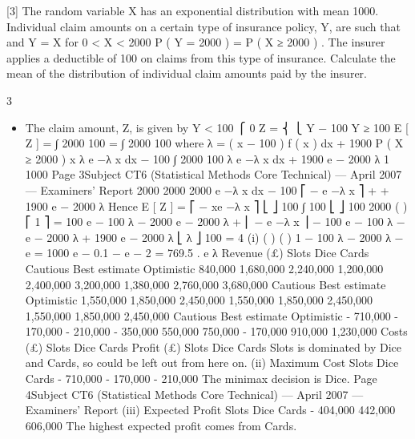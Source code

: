 \documentclass[a4paper,12pt]{article}
\begin{document}

[3]
The random variable X has an exponential distribution with mean 1000. Individual
claim amounts on a certain type of insurance policy, Y, are such that
and
Y = X
for 0 < X < 2000
P ( Y = 2000 ) = P ( X ≥ 2000 ) .
The insurer applies a deductible of 100 on claims from this type of insurance.
Calculate the mean of the distribution of individual claim amounts paid by the insurer.


3
\begin{itemize}
\item The claim amount, Z, is given by
Y < 100
⎧ 0
Z = ⎨
⎩ Y − 100 Y ≥ 100
E [ Z ] = ∫
2000
100
= ∫
2000
100
where λ =
( x − 100 ) f ( x ) dx + 1900 P ( X ≥ 2000 )
x λ e −λ x dx − 100 ∫
2000
100
λ e −λ x dx + 1900 e − 2000 λ
1
1000
Page 3Subject CT6 (Statistical Methods Core Technical) — April 2007 — Examiners’ Report
2000
2000
2000
e −λ x dx − 100 ⎡ − e −λ x ⎤
+
+ 1900 e − 2000 λ
Hence E [ Z ] = ⎡ − xe −λ x ⎤
⎣
⎦ 100 ∫ 100
⎣
⎦ 100
2000
(
)
⎡ 1
⎤
= 100 e − 100 λ − 2000 e − 2000 λ + ⎢ − e −λ x ⎥
− 100 e − 100 λ − e − 2000 λ + 1900 e − 2000 λ
⎣ λ
⎦ 100
=
4
(i)
(
)
(
)
1 − 100 λ − 2000 λ
− e
= 1000 e − 0.1 − e − 2 = 769.5 .
e
λ
Revenue (£)
Slots
Dice
Cards
Cautious Best estimate Optimistic
840,000
1,680,000
2,240,000 1,200,000
2,400,000
3,200,000 1,380,000
2,760,000
3,680,000
Cautious Best estimate Optimistic
1,550,000
1,850,000
2,450,000 1,550,000
1,850,000
2,450,000 1,550,000
1,850,000
2,450,000
Cautious Best estimate Optimistic
- 710,000
- 170,000
- 210,000 - 350,000
550,000
750,000 - 170,000
910,000
1,230,000
Costs (£)
Slots
Dice
Cards
Profit (£)
Slots
Dice
Cards
Slots is dominated by Dice and Cards, so could be left out from here on.
(ii)
Maximum
Cost
Slots
Dice
Cards
- 710,000
- 170,000
- 210,000
The minimax decision is Dice.
Page 4Subject CT6 (Statistical Methods Core Technical) — April 2007 — Examiners’ Report
(iii)
Expected
Profit
Slots
Dice
Cards
- 404,000
442,000
606,000
The highest expected profit comes from Cards.
\end{itemize}
\end{document}
